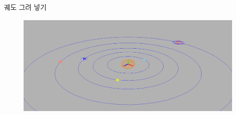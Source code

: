 \documentclass{beamer}
\begin{document}
\begin{frame}[fragile]{궤도 그려 넣기}

\begin{figure}
    \includegraphics[height=5cm]{OGL_transform/solar2.png}
\end{figure}

\end{frame}
\end{document}
